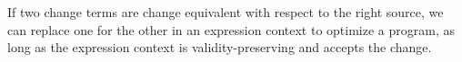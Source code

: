 

If two change terms are change equivalent with respect to the
right source, we can replace one for the other in an expression
context to optimize a program, as long as the expression context
is validity-preserving and accepts the change.

